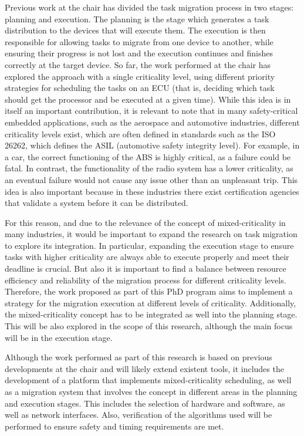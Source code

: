 Previous work at the chair has divided the task migration process in two stages: planning and execution. The planning is the stage which generates a task distribution to the devices that will execute them. The execution is then responsible for allowing tasks to migrate from one device to another, while ensuring their progress is not lost and the execution continues and finishes correctly at the target device. So far, the work performed at the chair has explored the approach with a single criticality level, using different priority strategies for scheduling the tasks on an ECU (that is, deciding which task should get the processor and be executed at a given time). While this idea is in itself an important contribution, it is relevant to note that in many safety-critical embedded applications, such as the aerospace and automotive industries, different criticality levels exist, which are often defined in standards such as the ISO 26262, which defines the ASIL (automotive safety integrity level). For example, in a car, the correct functioning of the ABS is highly critical, as a failure could be fatal. In contrast, the functionality of the radio system has a lower criticality, as an eventual failure would not cause any issue other than an unpleasant trip. This idea is also important because in these industries there exist certification agencies that validate a system before it can be distributed.

For this reason, and due to the relevance of the concept of mixed-criticality in many industries, it would be important to expand the research on task migration to explore its integration. In particular, expanding the execution stage to ensure tasks with higher criticality are always able to execute properly and meet their deadline is crucial. But also it is important to find a balance between resource efficiency and reliability of the migration process for different criticality levels. Therefore, the work proposed as part of this PhD program aims to implement a strategy for the migration execution at different levels of criticality. Additionally, the mixed-criticality concept has to be integrated as well into the planning stage. This will be also explored in the scope of this research, although the main focus will be in the execution stage.

Although the work performed as part of this research is based on previous developments at the chair and will likely extend existent tools, it includes the development of a platform that implements mixed-criticality scheduling, as well as a migration system that involves the concept in different areas in the planning and execution stages. This includes the selection of hardware and software, as well as network interfaces. Also, verification of the algorithms used will be performed to ensure safety and timing requirements are met.

